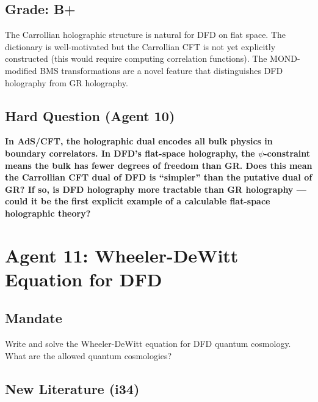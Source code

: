 \documentclass[11pt,a4paper]{article}
\begin{document}
\subsection{Grade: B+}

The Carrollian holographic structure is natural for DFD on flat space. The dictionary is well-motivated but the Carrollian CFT is not yet explicitly constructed (this would require computing correlation functions). The MOND-modified BMS transformations are a novel feature that distinguishes DFD holography from GR holography.

\subsection{Hard Question (Agent 10)}

\textbf{In AdS/CFT, the holographic dual encodes all bulk physics in boundary correlators. In DFD's flat-space holography, the $\psi$-constraint means the bulk has fewer degrees of freedom than GR. Does this mean the Carrollian CFT dual of DFD is ``simpler'' than the putative dual of GR? If so, is DFD holography more tractable than GR holography --- could it be the first explicit example of a calculable flat-space holographic theory?}

\newpage

\section{Agent 11: Wheeler-DeWitt Equation for DFD}
\label{sec:agent11}

\subsection{Mandate}

Write and solve the Wheeler-DeWitt equation for DFD quantum cosmology. What are the allowed quantum cosmologies?

\subsection{New Literature (i34)}
\end{document}
